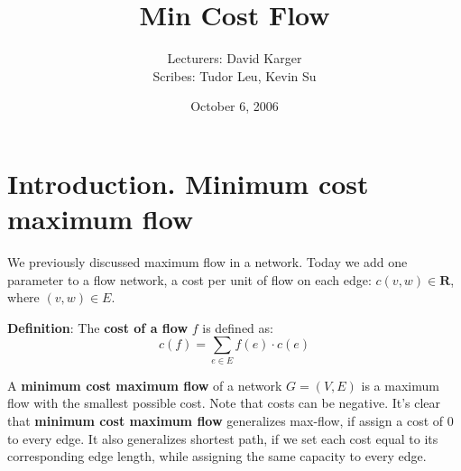 \documentclass{article}
\title{Min Cost Flow}
\date{October 6, 2006}
\author{Lecturers: David Karger\\ Scribes: Tudor Leu, Kevin Su}
\begin{document}
%
%
%
%

%



\section{Introduction. Minimum cost maximum flow}

We previously discussed maximum flow in a network. Today we add one parameter to a flow network, a cost per unit of flow on each edge: $c(v, w) \in \mathbf{R}$, where $(v, w) \in E$.

\textbf{Definition}:
The {\bf cost of a flow} $f$ is defined as:
\begin{displaymath}
c(f) = \sum_{e \in E} f(e)\cdot c(e)
\end{displaymath}

A {\bf minimum cost maximum flow} of a network $G=(V, E)$ is a maximum flow with the smallest possible cost. Note that costs can be negative.  It's clear that {\bf minimum cost maximum flow} generalizes max-flow, if assign a cost of $0$ to every edge.  It also generalizes shortest path, if we set each cost equal to its corresponding edge length, while assigning the same capacity to every edge.
\end{document}
